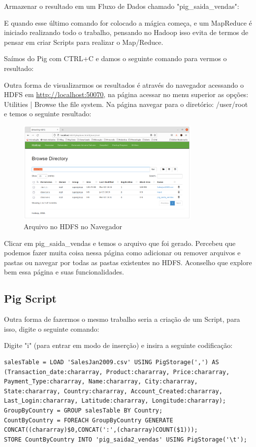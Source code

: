 \documentclass[a4paper,11pt]{article}
\begin{document}
Armazenar o resultado em um Fluxo de Dados chamado "pig\_saida\_vendas": \\

E quando esse último comando for colocado a mágica começa, e um MapReduce é iniciado realizando todo o trabalho, pensando no Hadoop isso evita de termos de pensar em criar Scripts para realizar o Map/Reduce.

Saímos do Pig com CTRL+C e damos o seguinte comando para vermos o resultado: \\

Outra forma de visualizarmos os resultados é através do navegador acessando o HDFS em \url{http://localhost:50070}, na página acessar no menu superior as opções: Utilities | Browse the file system. Na página navegar para o diretório: /user/root e temos o seguinte resultado:
\begin{figure}[H]
	\centering
	\includegraphics[width=0.8\textwidth]{imagem/hdfsbrowser}
	\caption{Arquivo no HDFS no Navegador}
\end{figure}

Clicar em pig\_saida\_vendas e temos o arquivo que foi gerado. Percebeu que podemos fazer muita coisa nessa página como adicionar ou remover arquivos e pastas ou navegar por todas as pastas existentes no HDFS. Aconselho que explore bem essa página e suas funcionalidades.

\subsection{Pig Script}
Outra forma de fazermos o mesmo trabalho seria a criação de um Script, para isso, digite o seguinte comando: \\

Digite "i" (para entrar em modo de inserção) e insira a seguinte codificação:
\begin{lstlisting}[]
salesTable = LOAD 'SalesJan2009.csv' USING PigStorage(',') AS (Transaction_date:chararray, Product:chararray, Price:chararray, Payment_Type:chararray, Name:chararray, City:chararray, State:chararray, Country:chararray, Account_Created:chararray, Last_Login:chararray, Latitude:chararray, Longitude:chararray);
GroupByCountry = GROUP salesTable BY Country;
CountByCountry = FOREACH GroupByCountry GENERATE CONCAT((chararray)$0,CONCAT(':',(chararray)COUNT($1)));
STORE CountByCountry INTO 'pig_saida2_vendas' USING PigStorage('\t');
\end{lstlisting}
\end{document}

